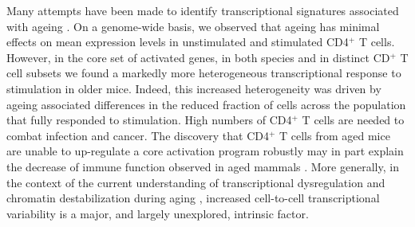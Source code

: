 Many attempts have been made to identify transcriptional signatures associated with ageing \citep{Magalhaes2009, Chen2013, Kowalczyk2015}. On a genome-wide basis, we observed that ageing has minimal effects on mean expression levels in unstimulated and stimulated CD4$^+$ T cells. However, in the core set of activated genes, in both species and in distinct CD$^+$ T cell subsets we found a markedly more heterogeneous transcriptional response to stimulation in older mice. Indeed, this increased heterogeneity was driven by ageing associated differences in the reduced fraction of cells across the population that fully responded to stimulation. High numbers of CD4$^+$ T cells are needed to combat infection and cancer. The discovery that CD4$^+$ T cells from aged mice are unable to up-regulate a core activation program robustly may in part explain the decrease of immune function observed in aged mammals \citep{Goronzy2013}. More generally, in the context of the current understanding of transcriptional dysregulation and chromatin destabilization during aging \citep{Booth2007}, increased cell-to-cell transcriptional variability is a major, and largely unexplored, intrinsic factor.\\




